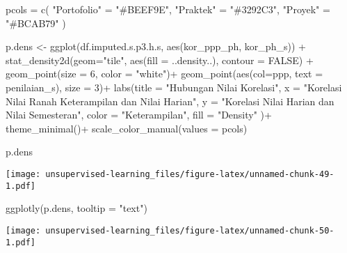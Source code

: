 \documentclass[
]{article}
\newenvironment{Shaded}{\begin{snugshade}}{\end{snugshade}}
\newcommand{\AttributeTok}[1]{\textcolor[rgb]{0.77,0.63,0.00}{#1}}
\newcommand{\ConstantTok}[1]{\textcolor[rgb]{0.00,0.00,0.00}{#1}}
\newcommand{\DecValTok}[1]{\textcolor[rgb]{0.00,0.00,0.81}{#1}}
\newcommand{\FunctionTok}[1]{\textcolor[rgb]{0.00,0.00,0.00}{#1}}
\newcommand{\NormalTok}[1]{#1}
\newcommand{\OtherTok}[1]{\textcolor[rgb]{0.56,0.35,0.01}{#1}}
\newcommand{\SpecialCharTok}[1]{\textcolor[rgb]{0.00,0.00,0.00}{#1}}
\newcommand{\StringTok}[1]{\textcolor[rgb]{0.31,0.60,0.02}{#1}}
\begin{document}
\begin{Shaded}
\begin{Highlighting}[]
\NormalTok{pcols }\OtherTok{=} \FunctionTok{c}\NormalTok{(}
  \StringTok{"Portofolio"} \OtherTok{=} \StringTok{"\#BEEF9E"}\NormalTok{,}
  \StringTok{"Praktek"} \OtherTok{=} \StringTok{"\#3292C3"}\NormalTok{,}
  \StringTok{"Proyek"} \OtherTok{=} \StringTok{"\#BCAB79"}
\NormalTok{)}
  
\NormalTok{p.dens }\OtherTok{\textless{}{-}}
\FunctionTok{ggplot}\NormalTok{(df.imputed.s.p3.h.s, }\FunctionTok{aes}\NormalTok{(kor\_ppp\_ph, kor\_ph\_s)) }\SpecialCharTok{+}
  \FunctionTok{stat\_density2d}\NormalTok{(}\AttributeTok{geom=}\StringTok{"tile"}\NormalTok{, }\FunctionTok{aes}\NormalTok{(}\AttributeTok{fill =}\NormalTok{ ..density..), }\AttributeTok{contour =} \ConstantTok{FALSE}\NormalTok{) }\SpecialCharTok{+} 
  \FunctionTok{geom\_point}\NormalTok{(}\AttributeTok{size =} \DecValTok{6}\NormalTok{, }\AttributeTok{color =} \StringTok{"white"}\NormalTok{)}\SpecialCharTok{+}
  \FunctionTok{geom\_point}\NormalTok{(}\FunctionTok{aes}\NormalTok{(}\AttributeTok{col=}\NormalTok{ppp, }\AttributeTok{text =}\NormalTok{ penilaian\_s), }\AttributeTok{size =} \DecValTok{3}\NormalTok{)}\SpecialCharTok{+}
  \FunctionTok{labs}\NormalTok{(}\AttributeTok{title =} \StringTok{"Hubungan Nilai Korelasi"}\NormalTok{,}
       \AttributeTok{x =} \StringTok{"Korelasi Nilai Ranah Keterampilan dan Nilai Harian"}\NormalTok{,}
       \AttributeTok{y =} \StringTok{"Korelasi Nilai Harian dan Nilai Semesteran"}\NormalTok{,}
       \AttributeTok{color =} \StringTok{"Keterampilan"}\NormalTok{,}
       \AttributeTok{fill =} \StringTok{"Density"}
\NormalTok{       )}\SpecialCharTok{+}
  \FunctionTok{theme\_minimal}\NormalTok{()}\SpecialCharTok{+}
  \FunctionTok{scale\_color\_manual}\NormalTok{(}\AttributeTok{values =}\NormalTok{ pcols)}
  

\NormalTok{p.dens }
\end{Highlighting}
\end{Shaded}

\texttt{[image: unsupervised-learning\_files/figure-latex/unnamed-chunk-49-1.pdf]}

\begin{Shaded}
\begin{Highlighting}[]
\FunctionTok{ggplotly}\NormalTok{(p.dens, }\AttributeTok{tooltip =} \StringTok{"text"}\NormalTok{)}
\end{Highlighting}
\end{Shaded}

\texttt{[image: unsupervised-learning\_files/figure-latex/unnamed-chunk-50-1.pdf]}
\end{document}
